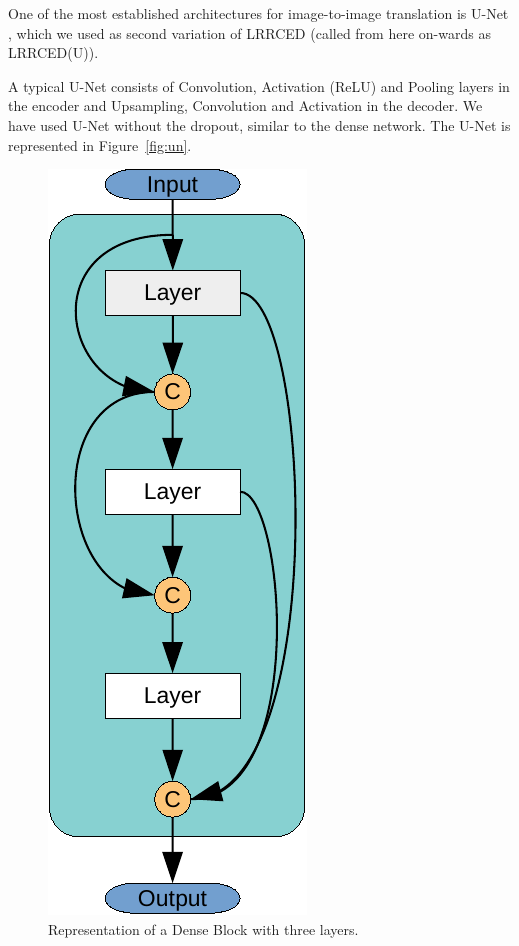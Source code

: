 One of the most established architectures for image-to-image translation is U-Net \cite{ronneberger2015u}, which we used as second variation of \ac{LRRCED} (called from here on-wards as \ac{LRRCED}(U)).
 
A typical U-Net consists of Convolution, Activation (\ac{ReLU}) and Pooling layers in the encoder and Upsampling, Convolution and Activation in the decoder. We have used U-Net without the dropout, similar to the dense network. The U-Net is represented in Figure~\ref{fig:un}. 

\begin{figure}[!htbp]
	\centering
	\includegraphics[width=0.23\linewidth]{./Figures/dense_block-crop.pdf}
	\caption{Representation of a Dense Block with three layers.}
	\label{fig:db}
\end{figure}



